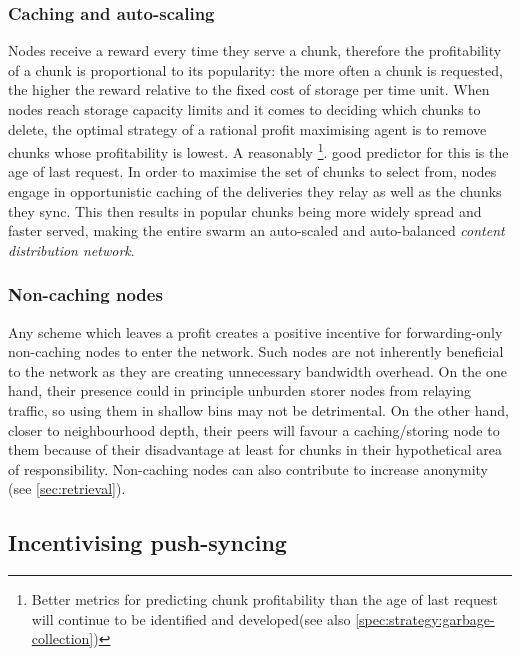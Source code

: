 \subsubsection{Caching and auto-scaling}\label{sec:caching}

Nodes receive a reward every time they serve a chunk, therefore the profitability of a chunk is proportional to its popularity: the more often a chunk is requested, the higher the reward relative to the fixed cost of storage per time unit. When nodes reach storage capacity limits and it comes to deciding which chunks to delete, the optimal strategy of a rational profit maximising agent is to remove chunks whose profitability is lowest. A reasonably%
%
\footnote{Better metrics for predicting chunk profitability than the age of last request will continue to be identified and developed(see also \ref{spec:strategy:garbage-collection})}.
good predictor for this is the age of last request. In order to maximise the set of chunks to select from, nodes engage in opportunistic caching of the deliveries they relay as well as the chunks they sync. This then results in popular chunks being more widely spread and faster served, making the entire swarm an auto-scaled and auto-balanced \emph{content distribution network}.


\subsubsection{Non-caching nodes}

Any scheme which leaves  a profit creates a positive incentive for forwarding-only non-caching nodes to enter the network. Such nodes are not inherently beneficial to the network as they are creating unnecessary bandwidth overhead. On the one hand, their presence could in principle unburden storer nodes from relaying traffic, so using them in shallow bins may not be detrimental. On the other hand, closer to neighbourhood depth, their peers will favour a caching/storing node to them because of their disadvantage at least for chunks in their hypothetical area of responsibility. Non-caching nodes can also contribute to increase anonymity (see \ref{sec:retrieval}).

\subsection{Incentivising push-syncing\statusgreen}\label{sec:push-sync-incentives}

\green{}


